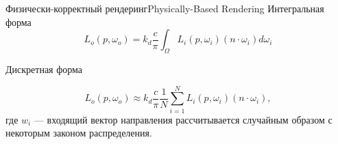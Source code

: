 \documentclass{beamer}
\begin{document}
	\begin{frame}{Физически-корректный рендеринг}{Physically-Based Rendering}
		Интегральная форма
		\[
			L_o(p,\omega_o) = k_d \frac{c}{\pi}
			\int_{\Omega}
			L_i(p, \omega_i) (n \cdot \omega_i) d \omega_i
		\]

		Дискретная форма

		\[
			L_o(p,\omega_o) \approx k_d \frac{c}{\pi} \frac{1}{N}
			\sum_{i = 1}^{N}
			L_i(p, \omega_i) (n \cdot \omega_i) %
		,
		\]
		где 
		$w_i$ --- входящий вектор направления рассчитывается случайным образом с некоторым законом распределения.


	\end{frame}
\end{document}
